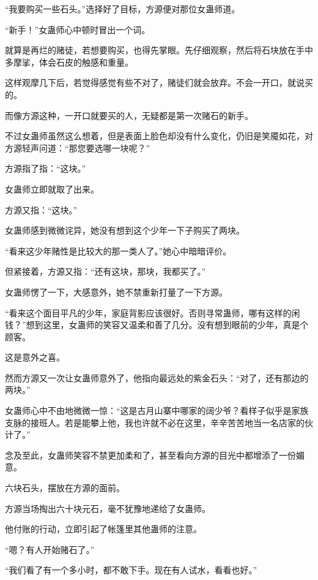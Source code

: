 
\begin{this_body}



“我要购买一些石头。”选择好了目标，方源便对那位女蛊师道。

“新手！”女蛊师心中顿时冒出一个词。

就算是再烂的赌徒，若想要购买，也得先掌眼。先仔细观察，然后将石块放在手中多摩挲，体会石皮的触感和重量。

这样观摩几下后，若觉得感觉有些不对了，赌徒们就会放弃。不会一开口，就说买的。

而像方源这种，一开口就要买的人，无疑都是第一次赌石的新手。

不过女蛊师虽然这么想着，但是表面上脸色却没有什么变化，仍旧是笑魇如花，对方源轻声问道：“那您要选哪一块呢？”

方源指了指：“这块。”

女蛊师立即就取了出来。

方源又指：“这块。”

女蛊师感到微微诧异，她没有想到这个少年一下子购买了两块。

“看来这少年赌性是比较大的那一类人了。”她心中暗暗评价。

但紧接着，方源又指：“还有这块，那块，我都买了。”

女蛊师愣了一下，大感意外，她不禁重新打量了一下方源。

“看来这个面目平凡的少年，家庭背影应该很好。否则寻常蛊师，哪有这样的闲钱？”想到这里，女蛊师的笑容又温柔和善了几分。没有想到眼前的少年，真是个顾客。

这是意外之喜。

然而方源又一次让女蛊师意外了，他指向最远处的紫金石头：“对了，还有那边的两块。”

女蛊师心中不由地微微一惊：“这是古月山寨中哪家的阔少爷？看样子似乎是家族支脉的接班人。若是能攀上他，我也许就不必在这里，辛辛苦苦地当一名店家的伙计了。”

念及至此，女蛊师笑容不禁更加柔和了，甚至看向方源的目光中都增添了一份媚意。

六块石头，摆放在方源的面前。

方源当场掏出六十块元石，毫不犹豫地递给了女蛊师。

他付账的行动，立即引起了帐篷里其他蛊师的注意。

“嗯？有人开始赌石了。”

“我们看了有一个多小时，都不敢下手。现在有人试水，看看也好。”


\end{this_body}
